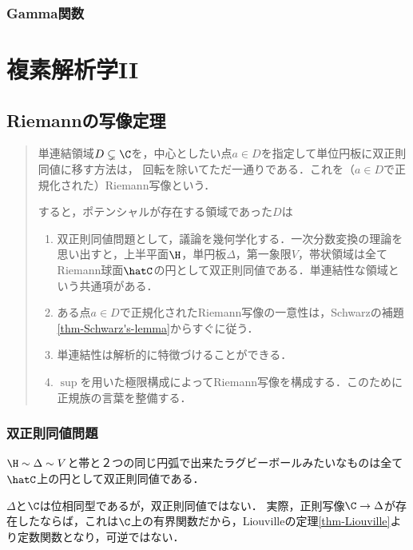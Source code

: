 \documentclass[uplatex, dvipdfmx]{jsreport}
\begin{document}
\section{Gamma関数}

\part{複素解析学II}

\chapter{Riemannの写像定理}

\begin{quotation}
    単連結領域$D\subsetneq\C$を，中心としたい点$a\in D$を指定して単位円板に双正則同値に移す方法は，
    回転を除いてただ一通りである．これを（$a\in D$で正規化された）Riemann写像という．

    すると，ポテンシャルが存在する領域であった$D$は
    \begin{enumerate}
        \item 双正則同値問題として，議論を幾何学化する．一次分数変換の理論を思い出すと，上半平面$\H$，単円板$\Delta$，第一象限$V$，帯状領域は全てRiemann球面$\hatC$の円として双正則同値である．単連結性な領域という共通項がある．
        \item ある点$a\in D$で正規化されたRiemann写像の一意性は，Schwarzの補題\ref{thm-Schwarz's-lemma}からすぐに従う．
        \item 単連結性は解析的に特徴づけることができる．
        \item $\sup$を用いた極限構成によってRiemann写像を構成する．このために正規族の言葉を整備する．
    \end{enumerate}
\end{quotation}

\section{双正則同値問題}

\begin{tcolorbox}[colframe=ForestGreen, colback=ForestGreen!10!white,breakable,colbacktitle=ForestGreen!40!white,coltitle=black,fonttitle=\bfseries\sffamily,
title=幾何学化]
    $\H\sim\Delta\sim V$と帯と２つの同じ円弧で出来たラグビーボールみたいなものは全て$\hatC$上の円として双正則同値である．
\end{tcolorbox}

\begin{example}
    $\Delta$と$\C$は位相同型であるが，双正則同値ではない．
    実際，正則写像$\C\to\Delta$が存在したならば，これは$\C$上の有界関数だから，Liouvilleの定理\ref{thm-Liouville}より定数関数となり，可逆ではない．
\end{example}
\end{document}
